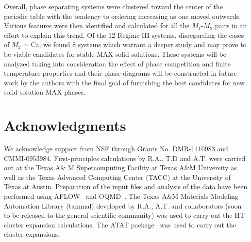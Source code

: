 \documentclass[preprint,amsmath,amssymb,aps, prb,showkeys]{revtex4-1}
\begin{document}
Overall, phase separating systems were clustered toward the center of the periodic table with the tendency to ordering increasing as one moved outwards. Various features were then identified and calculated for all the  $M_1$-$M_2$ pairs in an effort to explain this trend. Of the 12 Regime III systems, disregarding the cases of $M_2$ = Ca, we found 8 systems which warrant a deeper study and may prove to be viable candidates for stable MAX solid-solutions. These systems will be analyzed taking into consideration the effect of phase competition and finite temperature properties and their phase diagrams will be constructed in future work by the authors with the final goal of furnishing the best candidates for new solid-solution MAX phases.
\section{Acknowledgments}
\label{sec:ack}
We acknowledge support from NSF through Grants No. DMR-1410983 and CMMI-0953984. First-principles calculations by R.A., T.D and A.T. were carried out at the Texas A\& M Supercomputing Facility at Texas A\&M University as well as the Texas Advanced Computing Center (TACC) at the University of Texas at Austin. Preparation of the input files and analysis of the data have been performed using AFLOW~\cite{curtarolo2012aflowlib} and OQMD~\cite{saal2013materials}. The Texas A\&M Materials Modeling Automation Library (tammal) developed by R.A., A.T. and collaborators (soon to be released to the general scientific community) was used to carry out the HT cluster expansion calculations. The ATAT package~\cite{vanderwalleATAT} was used to carry out the cluster expansions. 


\end{document}
